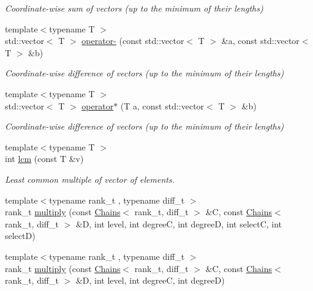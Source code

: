 \begin{DoxyCompactItemize}
\begin{DoxyCompactList}\small\item\em Coordinate-\/wise sum of vectors (up to the minimum of their lengths) \end{DoxyCompactList}\item 
{\footnotesize template$<$typename T $>$ }\\std\+::vector$<$ T $>$ \hyperlink{namespaceMackey_ae86e49097ef9a09ebcd0173881e88786}{operator-\/} (const std\+::vector$<$ T $>$ \&a, const std\+::vector$<$ T $>$ \&b)
\begin{DoxyCompactList}\small\item\em Coordinate-\/wise difference of vectors (up to the minimum of their lengths) \end{DoxyCompactList}\item 
{\footnotesize template$<$typename T $>$ }\\std\+::vector$<$ T $>$ \hyperlink{namespaceMackey_ae235ee5dd92dc1ca64388b8fbb1b4d75}{operator$\ast$} (T a, const std\+::vector$<$ T $>$ \&b)
\begin{DoxyCompactList}\small\item\em Coordinate-\/wise difference of vectors (up to the minimum of their lengths) \end{DoxyCompactList}\item 
{\footnotesize template$<$typename T $>$ }\\int \hyperlink{namespaceMackey_a5d8ae76ffb9440e27bfca124d26ee1b2}{lcm} (const T \&v)
\begin{DoxyCompactList}\small\item\em Least common multiple of vector of elements. \end{DoxyCompactList}\item 
{\footnotesize template$<$typename rank\+\_\+t , typename diff\+\_\+t $>$ }\\rank\+\_\+t \hyperlink{namespaceMackey_a80dbde3a859378ede596b48869ec50d9}{multiply} (const \hyperlink{classMackey_1_1Chains}{Chains}$<$ rank\+\_\+t, diff\+\_\+t $>$ \&C, const \hyperlink{classMackey_1_1Chains}{Chains}$<$ rank\+\_\+t, diff\+\_\+t $>$ \&D, int level, int degreeC, int degreeD, int selectC, int selectD)
\item 
{\footnotesize template$<$typename rank\+\_\+t , typename diff\+\_\+t $>$ }\\rank\+\_\+t \hyperlink{namespaceMackey_a2eca4cc709501ad3fc20b82fe4bcbd33}{multiply} (const \hyperlink{classMackey_1_1Chains}{Chains}$<$ rank\+\_\+t, diff\+\_\+t $>$ \&C, const \hyperlink{classMackey_1_1Chains}{Chains}$<$ rank\+\_\+t, diff\+\_\+t $>$ \&D, int level, int degreeC, int degreeD)

\end{DoxyCompactItemize}
